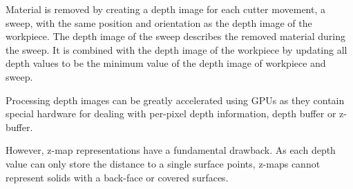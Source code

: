 \begin{description}
	Material is removed by creating a depth image for each cutter movement, \ie a sweep, with the same position and orientation as the depth image of the workpiece.
	The depth image of the sweep describes the removed material during the sweep.
	It is combined with the depth image of the workpiece by updating all depth values to be the minimum value of the depth image of workpiece and sweep.

	Processing depth images can be greatly accelerated using GPUs as they contain special hardware for dealing with per-pixel depth information, \ie depth buffer or z-buffer.

	However, z-map representations have a fundamental drawback.
	As each depth value can only store the distance to a single surface points, z-maps cannot represent solids with a back-face or covered surfaces.


\end{description}
